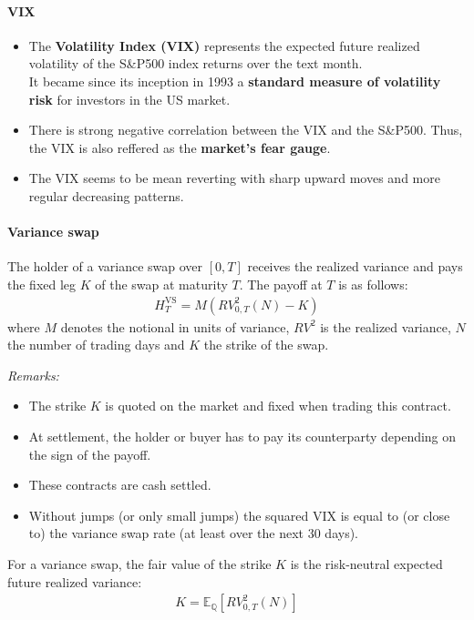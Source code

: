 \documentclass[a4paper,landscape,7pt,fleqn]{scrartcl}
\renewcommand{\emph}[1]{\textbf{#1}}
\begin{document}
\begin{multicols*}{3}
\paragraph{VIX}
\begin{itemize}
\item The \emph{Volatility Index (VIX)} represents the expected future realized volatility of the S\&P500 index returns over the text month. \\
It became since its inception in 1993 a \emph{standard measure of volatility risk} for investors in the US market.
\item There is strong negative correlation between the VIX and the S\&P500. Thus, the VIX is also reffered as the \emph{market's fear gauge}.
\item The VIX seems to be mean reverting with sharp upward moves and more regular decreasing patterns.
\end{itemize}

\paragraph{Variance swap}
The holder of a variance swap over $[0,T]$ receives the realized variance and pays the fixed leg $K$ of the swap at maturity $T$. The payoff at $T$ is as follows:
\begin{align*}
H_T^\text{VS} = M(RV_{0,T}^2(N) - K)
\end{align*}
where $M$ denotes the notional in units of variance, $RV^2$ is the realized variance, $N$ the number of trading days and $K$ the strike of the swap.

\textit{Remarks:}
\begin{itemize}
\item The strike $K$ is quoted on the market and fixed when trading this contract.
\item At settlement, the holder or buyer has to pay its counterparty depending on the sign of the payoff.
\item These contracts are cash settled.
\item Without jumps (or only small jumps) the squared VIX is equal to (or close to) the variance swap rate (at least over the next 30 days).
\end{itemize}
For a variance swap, the fair value of the strike $K$ is the risk-neutral expected future realized variance:
\begin{align*}
K = \mathbb{E}_\mathbb{Q}[RV_{0,T}^2(N)]
\end{align*}


\end{multicols*}
\end{document}
